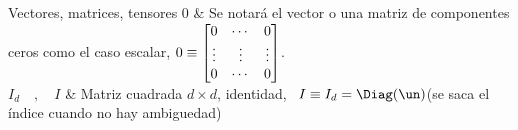 \begin{notation}{Vectores, matrices, tensores}
\hline
%
$0$ & Se notar\'a el vector o una matriz de componentes ceros como el caso
escalar,\vspace{1mm}\newline
$0 \equiv \protect\begin{bmatrix}
   0   & \cdots &    0   \\
\vdots & \vdots & \vdots \\
   0   & \cdots &    0
\protect\end{bmatrix}$.\vspace{1mm}\\[2.5mm]
\hline
%
$I_d \quad , \quad I$ & Matriz cuadrada $d \times d$, identidad, \ $I \equiv I_d
= \Diag(\un)$\vspace{1mm}\newline (se saca el \'indice cuando no hay ambiguedad)\\[2.5mm]
\hline
%

\end{notation}
